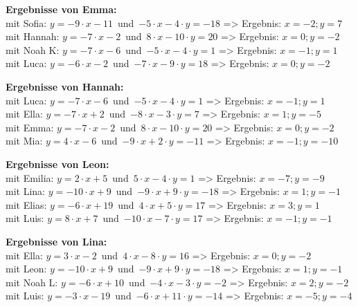 \begin{minipage}{\textwidth}
\textbf{Ergebnisse von Emma:}\\
mit Sofia: $y=-9\cdot x-11$\mbox{ }und\mbox{ }$-5\cdot x-4\cdot y=-18$ => Ergebnis: $x=-2;y=7$
\\
mit Hannah: $y=-7\cdot x-2$\mbox{ }und\mbox{ }$8\cdot x-10\cdot y=20$ => Ergebnis: $x=0;y=-2$
\\
mit Noah K: $y=-7\cdot x-6$\mbox{ }und\mbox{ }$-5\cdot x-4\cdot y=1$ => Ergebnis: $x=-1;y=1$
\\
mit Luca: $y=-6\cdot x-2$\mbox{ }und\mbox{ }$-7\cdot x-9\cdot y=18$ => Ergebnis: $x=0;y=-2$
\\
\end{minipage}
\vspace*{3ex}

\begin{minipage}{\textwidth}
\textbf{Ergebnisse von Hannah:}\\
mit Luca: $y=-7\cdot x-6$\mbox{ }und\mbox{ }$-5\cdot x-4\cdot y=1$ => Ergebnis: $x=-1;y=1$
\\
mit Ella: $y=-7\cdot x+2$\mbox{ }und\mbox{ }$-8\cdot x-3\cdot y=7$ => Ergebnis: $x=1;y=-5$
\\
mit Emma: $y=-7\cdot x-2$\mbox{ }und\mbox{ }$8\cdot x-10\cdot y=20$ => Ergebnis: $x=0;y=-2$
\\
mit Mia: $y=4\cdot x-6$\mbox{ }und\mbox{ }$-9\cdot x+2\cdot y=-11$ => Ergebnis: $x=-1;y=-10$
\\
\end{minipage}
\vspace*{3ex}

\begin{minipage}{\textwidth}
\textbf{Ergebnisse von Leon:}\\
mit Emilia: $y=2\cdot x+5$\mbox{ }und\mbox{ }$5\cdot x-4\cdot y=1$ => Ergebnis: $x=-7;y=-9$
\\
mit Lina: $y=-10\cdot x+9$\mbox{ }und\mbox{ }$-9\cdot x+9\cdot y=-18$ => Ergebnis: $x=1;y=-1$
\\
mit Elias: $y=-6\cdot x+19$\mbox{ }und\mbox{ }$4\cdot x+5\cdot y=17$ => Ergebnis: $x=3;y=1$
\\
mit Luis: $y=8\cdot x+7$\mbox{ }und\mbox{ }$-10\cdot x-7\cdot y=17$ => Ergebnis: $x=-1;y=-1$
\\
\end{minipage}
\vspace*{3ex}

\begin{minipage}{\textwidth}
\textbf{Ergebnisse von Lina:}\\
mit Ella: $y=3\cdot x-2$\mbox{ }und\mbox{ }$4\cdot x-8\cdot y=16$ => Ergebnis: $x=0;y=-2$
\\
mit Leon: $y=-10\cdot x+9$\mbox{ }und\mbox{ }$-9\cdot x+9\cdot y=-18$ => Ergebnis: $x=1;y=-1$
\\
mit Noah L: $y=-6\cdot x+10$\mbox{ }und\mbox{ }$-4\cdot x-3\cdot y=-2$ => Ergebnis: $x=2;y=-2$
\\
mit Luis: $y=-3\cdot x-19$\mbox{ }und\mbox{ }$-6\cdot x+11\cdot y=-14$ => Ergebnis: $x=-5;y=-4$
\\
\end{minipage}
\vspace*{3ex}

